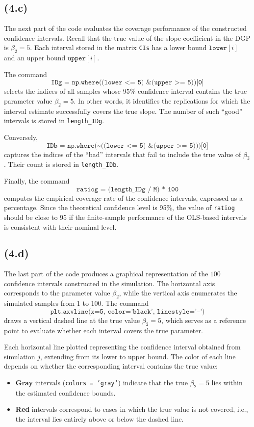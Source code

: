 \documentclass{article}
\begin{document}
\subsection*{(4.c)}
The next part of the code evaluates the coverage performance of the constructed 
confidence intervals. Recall that the true value of the slope coefficient in the DGP is 
\(\beta_2 = 5\). Each interval stored in the matrix \texttt{CIs} has a lower bound 
\(\texttt{lower}[i]\) and an upper bound \(\texttt{upper}[i]\).

The command
\[
\texttt{IDg = np.where((lower <= 5) \& (upper >= 5))[0]}
\]
selects the indices of all samples whose 95\% confidence interval contains the true 
parameter value \(\beta_2 = 5\). In other words, it identifies the replications for which the 
interval estimate successfully covers the true slope. The number of such ``good'' intervals 
is stored in \texttt{length\_IDg}.

Conversely,
\[
\texttt{IDb = np.where(\textasciitilde((lower <= 5) \& (upper >= 5)))[0]}
\]
captures the indices of the ``bad'' intervals that fail to include the true value of 
\(\beta_2\). Their count is stored in \texttt{length\_IDb}.

Finally, the command
\[
\texttt{ratiog = (length\_IDg / M) * 100}
\]
computes the empirical coverage rate of the confidence intervals, expressed as a 
percentage. Since the theoretical confidence level is 95\%, the value of 
\texttt{ratiog} should be close to 95 if the finite-sample performance of the OLS-based 
intervals is consistent with their nominal level.


\subsection*{(4.d)}
The last part of the code produces a graphical representation of the $100$ confidence 
intervals constructed in the simulation. The horizontal axis corresponds to the parameter 
value $\beta_2$, while the vertical axis enumerates the simulated samples from $1$ to $100$. 
The command
\[
\texttt{plt.axvline(x=5, color='black', linestyle='--')}
\]
draws a vertical dashed line at the true value $\beta_2 = 5$, which serves as a reference 
point to evaluate whether each interval covers the true parameter.

Each horizontal line plotted representing the confidence interval obtained from simulation $j$, extending from its lower 
to upper bound. The color of each line depends on whether the corresponding interval 
contains the true value:
\begin{itemize}
    \item {\textbf{Gray}} intervals (\texttt{colors = 'gray'}) indicate that 
    the true $\beta_2 = 5$ lies within the estimated confidence bounds.
    \item {\textbf{Red}} intervals correspond to cases in which the true value 
    is not covered, i.e., the interval lies entirely above or below the dashed line.
\end{itemize}
\end{document}
